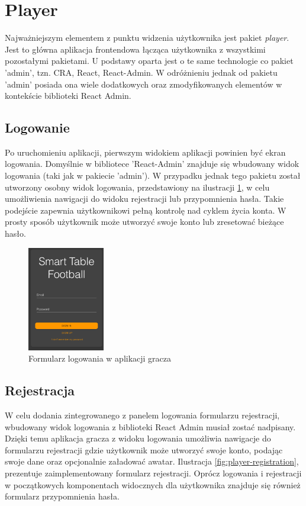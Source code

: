 \section{Player}
Najważniejszym elementem z punktu widzenia użytkownika jest pakiet \textit{player}. Jest to główna aplikacja frontendowa łącząca użytkownika z wszystkimi pozostałymi pakietami. U podstawy oparta jest o te same technologie co pakiet 'admin', tzn. CRA, React, React-Admin. W odróżnieniu jednak od pakietu 'admin' posiada ona wiele dodatkowych oraz zmodyfikowanych elementów w kontekście biblioteki React Admin.

\subsection{Logowanie}
Po uruchomieniu aplikacji, pierwszym widokiem aplikacji powinien być ekran logowania. Domyślnie w bibliotece 'React-Admin' znajduje się wbudowany widok logowania (taki jak w pakiecie 'admin'). W przypadku jednak tego pakietu został utworzony osobny widok logowania, przedstawiony na ilustracji \ref{fig:player-login}, w celu umożliwienia nawigacji do widoku rejestracji lub przypomnienia hasła. Takie podejście zapewnia użytkownikowi pełną kontrolę nad cyklem życia konta. W prosty sposób użytkownik może utworzyć swoje konto lub zresetować bieżące hasło.

\begin{figure}[h!]
  \centering
    \includegraphics[width=0.3\textwidth]{images/player/login.png}
  \caption{Formularz logowania w aplikacji gracza}
  \label{fig:player-login}
\end{figure}

\subsection{Rejestracja}

W celu dodania zintegrowanego z panelem logowania formularzu rejestracji, wbudowany widok logowania z biblioteki React Admin musiał zostać nadpisany. Dzięki temu aplikacja gracza z widoku logowania umożliwia nawigacje do formularzu rejestracji gdzie użytkownik może utworzyć swoje konto, podając swoje dane oraz opcjonalnie załadować awatar. Ilustracja \ref{fig:player-registration}, prezentuje zaimplementowany formularz rejestracji. Oprócz logowania i rejestracji w początkowych komponentach widocznych dla użytkownika znajduje się również formularz przypomnienia hasła.

